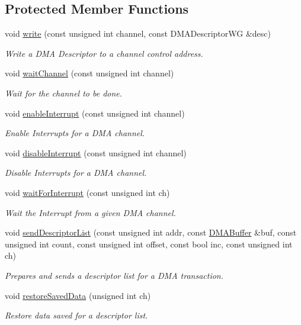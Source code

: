 \subsection*{Protected Member Functions}
\begin{CompactItemize}
\item 
void \hyperlink{classmprace_1_1DMAEngineWG_b0}{write} (const unsigned int channel, const DMADescriptor\-WG \&desc)
\begin{CompactList}\small\item\em Write a DMA Descriptor to a channel control address. \item\end{CompactList}\item 
void \hyperlink{classmprace_1_1DMAEngineWG_b1}{wait\-Channel} (const unsigned int channel)
\begin{CompactList}\small\item\em Wait for the channel to be done. \item\end{CompactList}\item 
void \hyperlink{classmprace_1_1DMAEngineWG_b2}{enable\-Interrupt} (const unsigned int channel)
\begin{CompactList}\small\item\em Enable Interrupts for a DMA channel. \item\end{CompactList}\item 
void \hyperlink{classmprace_1_1DMAEngineWG_b3}{disable\-Interrupt} (const unsigned int channel)
\begin{CompactList}\small\item\em Disable Interrupts for a DMA channel. \item\end{CompactList}\item 
void \hyperlink{classmprace_1_1DMAEngineWG_b4}{wait\-For\-Interrupt} (const unsigned int ch)
\begin{CompactList}\small\item\em Wait the Interrupt from a given DMA channel. \item\end{CompactList}\item 
void \hyperlink{classmprace_1_1DMAEngineWG_b5}{send\-Descriptor\-List} (const unsigned int addr, const \hyperlink{classmprace_1_1DMABuffer}{DMABuffer} \&buf, const unsigned int count, const unsigned int offset, const bool inc, const unsigned int ch)
\begin{CompactList}\small\item\em Prepares and sends a descriptor list for a DMA transaction. \item\end{CompactList}\item 
void \hyperlink{classmprace_1_1DMAEngineWG_b6}{restore\-Saved\-Data} (unsigned int ch)
\begin{CompactList}\small\item\em Restore data saved for a descriptor list. \item\end{CompactList}\end{CompactItemize}

